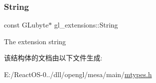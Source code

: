 \subsubsection{\texorpdfstring{String}{String}}
{\footnotesize\ttfamily const G\+Lubyte$\ast$ gl\+\_\+extensions\+::\+String}

The extension string 

该结构体的文档由以下文件生成\+:\begin{DoxyCompactItemize}
\item 
E\+:/\+React\+O\+S-\/0../dll/opengl/mesa/main/\hyperlink{mtypes_8h}{mtypes.\+h}\end{DoxyCompactItemize}
